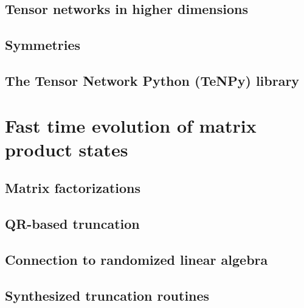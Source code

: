 \documentclass[12pt,a4paper]{book}
\begin{document}
\section{Tensor networks in higher dimensions}
\label{sec:tensornets:peps}


\section{Symmetries}
\label{sec:tensornets:symmetries}


\section{The Tensor Network Python (TeNPy) library}
\label{sec:tensornets:tenpy}


\chapter{Fast time evolution of matrix product states}
\label{ch:truncation}


\section{Matrix factorizations}
\label{sec:truncation:factorizations}


\section{QR-based truncation}
\label{sec:truncation:qr_tebd}


\section{Connection to randomized linear algebra}
\label{sec:truncation:rand_nla}


\section{Synthesized truncation routines}
\label{sec:truncation:synthesized_routines}

\end{document}
